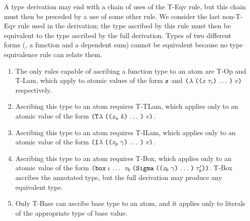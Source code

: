 \begin{sproof}
  A type derivation may end with a chain of uses of the {\sc T-Eqv} rule,
  but this chain must then be preceded by a use of some other rule.
  We consider the last non-{\sc T-Eqv} rule used in the derivation;
  the type ascribed by this rule must then be equivalent to
  the type ascribed by the full derivation.
  Types of two different forms (\eg, a function and a dependent sum)
  cannot be equivalent because no type equivalence rule can relate them.
  \begin{enumerate}
  \item{The only rules capable of ascribing a function type to an atom
    are {\sc T-Op} and {\sc T-Lam},
    which apply to atomic values of the form
    $\mathfrak{o}$ and
    $\lam{\sequence{\notevar{\var}{\type_i}}}{\expr}$ respectively.}
  \item{Ascribing this type to an atom requires {\sc T-TLam},
    which applies only to an atomic value of the form
    $\tlam{\sequence{\notevar{\var_u}{\kind}}}{\val}$.}
  \item{Ascribing this type to an atom requires {\sc T-ILam},
    which applies only to an atomic value of the form
    $\ilam{\sequence{\notevar{\var_p}{\sort}}}{\val}$.}
  \item{Ascribing this type to an atom requires {\sc T-Box},
    which applies only to an atomic value of the form
    \({\dsum
        {\sequence{\idx}}
        {\val_b}
        {\typedsum{\sequence{\notevar{\var_b}{\sort}}}{\type_b'}}}\).
      {\sc T-Box} ascribes the annotated type,
      but the full derivation may produce any equivalent type.}
  \item{Only {\sc T-Base} can ascribe base type to an atom,
      and it applies only to literals of the appropriate type of base value.}
  \end{enumerate}
\end{sproof}

